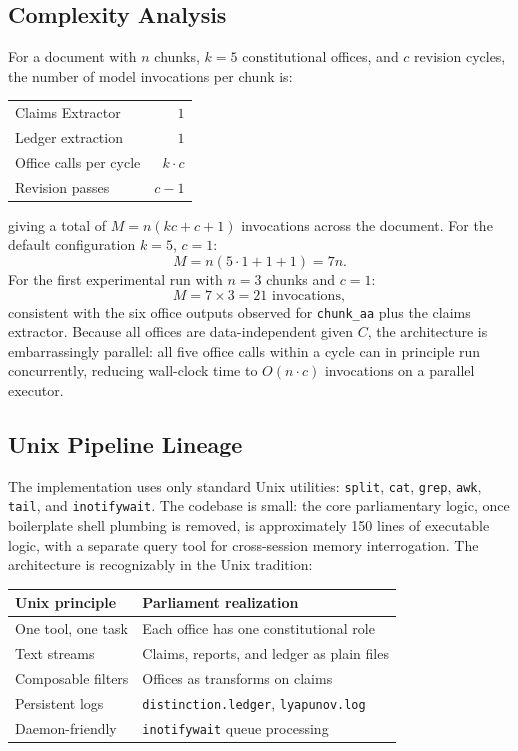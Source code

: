 \documentclass[12pt, a4paper]{article}
\theoremstyle{principle}
\theoremstyle{definition}
\begin{document}
\subsection{Complexity Analysis}

For a document with $n$ chunks, $k = 5$ constitutional offices, and $c$ revision
cycles, the number of model invocations per chunk is:
\begin{center}
\begin{tabular}{lr}
Claims Extractor & $1$ \\
Ledger extraction & $1$ \\
Office calls per cycle & $k \cdot c$ \\
Revision passes & $c - 1$ \\
\end{tabular}
\end{center}
giving a total of $M = n(kc + c + 1)$ invocations across the document. For the
default configuration $k = 5$, $c = 1$:
\[
M = n(5 \cdot 1 + 1 + 1) = 7n.
\]
For the first experimental run with $n = 3$ chunks and $c = 1$:
\[
M = 7 \times 3 = 21 \text{ invocations},
\]
consistent with the six office outputs observed for \texttt{chunk\_aa} plus the
claims extractor. Because all offices are data-independent given $C$, the
architecture is embarrassingly parallel: all five office calls within a cycle can
in principle run concurrently, reducing wall-clock time to
$O(n \cdot c)$ invocations on a parallel executor.

\subsection{Unix Pipeline Lineage}

The implementation uses only standard Unix utilities: \texttt{split},
\texttt{cat}, \texttt{grep}, \texttt{awk}, \texttt{tail}, and
\texttt{inotifywait}. The codebase is small: the core parliamentary logic, once
boilerplate shell plumbing is removed, is approximately 150 lines of executable
logic, with a separate query tool for cross-session memory interrogation.
The architecture is recognizably in the Unix tradition:

\begin{center}
\begin{tabular}{ll}
\toprule
Unix principle & Parliament realization \\
\midrule
One tool, one task & Each office has one constitutional role \\
Text streams & Claims, reports, and ledger as plain files \\
Composable filters & Offices as transforms on claims \\
Persistent logs & \texttt{distinction.ledger}, \texttt{lyapunov.log} \\
Daemon-friendly & \texttt{inotifywait} queue processing \\
\bottomrule
\end{tabular}
\end{center}
\end{document}
